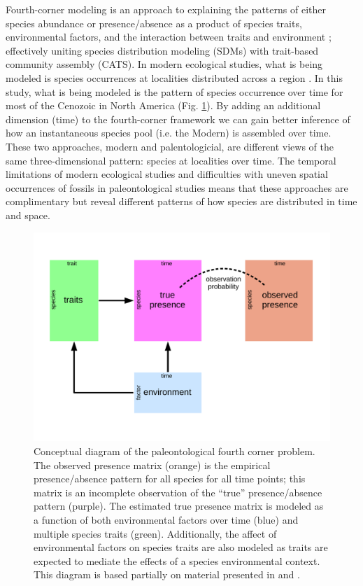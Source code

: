 \documentclass[12pt,letterpaper]{article}
\begin{document}
Fourth-corner modeling is an approach to explaining the patterns of either species abundance or presence/absence as a product of species traits, environmental factors, and the interaction between traits and environment \citep{Brown2014c,Warton2015a,Pollock2012,Jamil2013}; effectively uniting species distribution modeling (SDMs) with trait-based community assembly (CATS). In modern ecological studies, what is being modeled is species occurrences at localities distributed across a region \citep{Pollock2012,Jamil2013}. In this study, what is being modeled is the pattern of species occurrence over time for most of the Cenozoic in North America (Fig. \ref{fig:concept_fourth_corner}). By adding an additional dimension (time) to the fourth-corner framework we can gain better inference of how an instantaneous species pool (i.e. the Modern) is assembled over time. These two approaches, modern and palentologicial, are different views of the same three-dimensional pattern: species at localities over time. The temporal limitations of modern ecological studies and difficulties with uneven spatial occurrences of fossils in paleontological studies means that these approaches are complimentary but reveal different patterns of how species are distributed in time and space.

\begin{figure}[ht]
  \centering
  \includegraphics[width=\textwidth,height=0.5\textheight,keepaspectratio=true]{figure/paleo_fourth_corner}
  \caption[Conceptual diagram of the paleontological fourth-courner problem]{Conceptual diagram of the paleontological fourth corner problem. The observed presence matrix (orange) is the empirical presence/absence pattern for all species for all time points; this matrix is an incomplete observation of the ``true'' presence/absence pattern (purple). The estimated true presence matrix is modeled as a function of both environmental factors over time (blue) and multiple species traits (green). Additionally, the affect of environmental factors on species traits are also modeled as traits are expected to mediate the effects of a species environmental context. This diagram is based partially on material presented in \citet{Brown2014c} and \citet{Warton2015a}.}
  \label{fig:concept_fourth_corner}
\end{figure}
\end{document}
